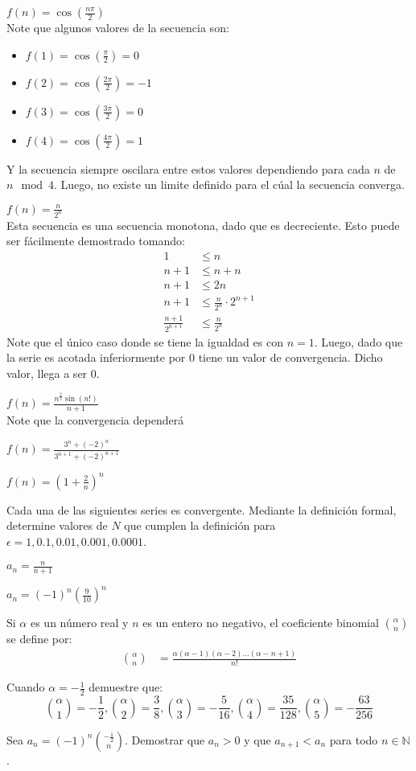 \documentclass[../main.tex]{subfiles}
\begin{document}
\question $f(n) = \cos \left(\frac{n\pi}{2}\right)$\\

Note que algunos valores de la secuencia son:
\begin{itemize}
    \item $f(1) = \cos\left(\frac{\pi}{2}\right) = 0$
    \item $f(2) = \cos\left(\frac{2\pi}{2}\right) = -1$
    \item $f(3) = \cos\left(\frac{3\pi}{2}\right) = 0$
    \item $f(4) = \cos\left(\frac{4\pi}{2}\right) = 1$
\end{itemize}

Y la secuencia siempre oscilara entre estos valores dependiendo para cada $n$ de $n \mod{4}$. Luego, no existe un limite definido para el cúal la secuencia converga.

\question $f(n) = \frac{n}{2^n}$\\

Esta secuencia es una secuencia monotona, dado que es decreciente. Esto puede ser fácilmente demostrado tomando:
\begin{align*}
    1 &\le n\\
    n + 1 &\le n + n\\
    n + 1 &\le 2n\\
    n + 1 &\le \frac{n}{2^n} \cdot 2^{n+1}\\
    \frac{n+1}{2^{n+1}} &\le \frac{n}{2^n}
\end{align*}
Note que el único caso donde se tiene la igualdad es con $n = 1$. Luego, dado que la serie es acotada inferiormente por $0$ tiene un valor de convergencia. Dicho valor, llega a ser $0$.

\question $f(n) = \frac{n^{\frac{2}{3}} \sin(n!)}{n+1}$\\
Note que la convergencia dependerá 

\question $f(n) = \frac{3^n + (-2)^n}{3^{n+1} + (-2)^{n+1}}$

\question $f(n) = \left(1 + \frac{2}{n}\right)^n$

Cada una de las siguientes series es convergente. Mediante la definición formal, determine valores de $N$ que cumplen la definición para $\epsilon = 1, 0.1, 0.01, 0.001, 0.0001$.

\question $a_n = \frac{n}{n+1}$

\question $a_n = (-1)^n \left(\frac{9}{10}\right)^n$

Si $\alpha$ es un número real y $n$ es un entero no negativo, el coeficiente binomial $\binom{\alpha}{n}$ se define por:
\begin{align*}
    \binom{\alpha}{n} &= \frac{\alpha (\alpha - 1)(\alpha - 2) \dots (\alpha - n + 1)}{n!}
\end{align*}
\begin{partes}
    \parte Cuando $\alpha = -\frac{1}{2}$ demuestre que:
    $$\binom{\alpha}{1} = -\frac{1}{2}, \binom{\alpha}{2} = \frac{3}{8}, \binom{\alpha}{3} = -\frac{5}{16}, \binom{\alpha}{4} = \frac{35}{128}, \binom{\alpha}{5} = -\frac{63}{256}$$

    \parte Sea $a_n = (-1)^n \binom{-\frac{1}{2}}{n}$. Demostrar que $a_n > 0$ y que $a_{n+1} < a_n$ para todo $n \in \mathbb{N}$.
\end{partes}
\end{document}
